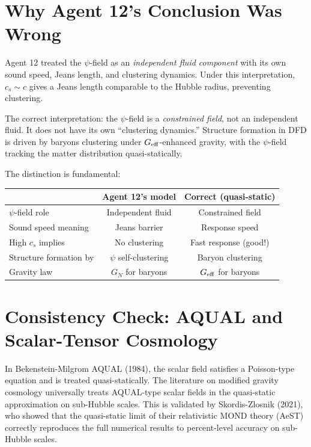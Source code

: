 \documentclass[11pt]{article}
\begin{document}
\section{Why Agent 12's Conclusion Was Wrong}

Agent 12 treated the $\psi$-field as an \emph{independent fluid component}
with its own sound speed, Jeans length, and clustering dynamics. Under this
interpretation, $c_s \sim c$ gives a Jeans length comparable to the Hubble
radius, preventing clustering.

The correct interpretation: the $\psi$-field is a \emph{constrained field},
not an independent fluid. It does not have its own ``clustering dynamics.''
Structure formation in DFD is driven by baryons clustering under
$G_{\rm eff}$-enhanced gravity, with the $\psi$-field tracking the
matter distribution quasi-statically.

The distinction is fundamental:
\begin{center}
\begin{tabular}{lcc}
\toprule
& \textbf{Agent 12's model} & \textbf{Correct (quasi-static)} \\
\midrule
$\psi$-field role & Independent fluid & Constrained field \\
Sound speed meaning & Jeans barrier & Response speed \\
High $c_s$ implies & No clustering & Fast response (good!) \\
Structure formation by & $\psi$ self-clustering & Baryon clustering \\
Gravity law & $G_N$ for baryons & $G_{\rm eff}$ for baryons \\
\bottomrule
\end{tabular}
\end{center}

\section{Consistency Check: AQUAL and Scalar-Tensor Cosmology}

In Bekenstein-Milgrom AQUAL (1984), the scalar field satisfies a Poisson-type
equation and is treated quasi-statically. The literature on modified gravity
cosmology universally treats AQUAL-type scalar fields in the quasi-static
approximation on sub-Hubble scales. This is validated by Skordis-Zlosnik
(2021), who showed that the quasi-static limit of their relativistic MOND
theory (AeST) correctly reproduces the full numerical results to percent-level
accuracy on sub-Hubble scales.
\end{document}
